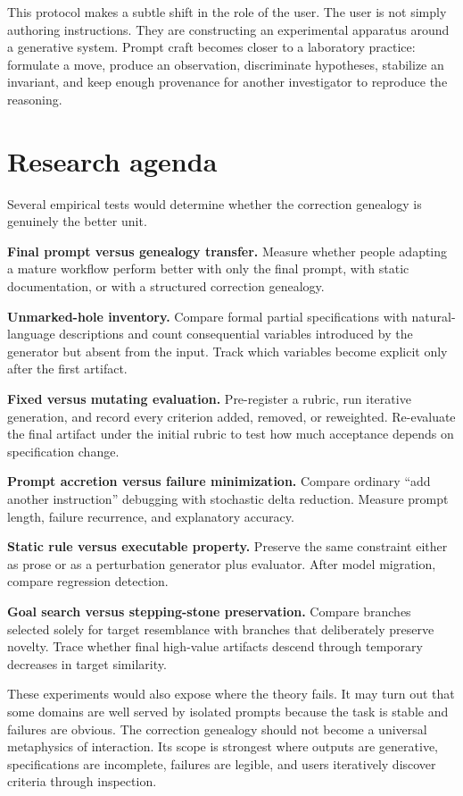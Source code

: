 \documentclass[11pt]{article}
\begin{document}
This protocol makes a subtle shift in the role of the user. The user is not simply authoring instructions. They are constructing an experimental apparatus around a generative system. Prompt craft becomes closer to a laboratory practice: formulate a move, produce an observation, discriminate hypotheses, stabilize an invariant, and keep enough provenance for another investigator to reproduce the reasoning.

\section{Research agenda}

Several empirical tests would determine whether the correction genealogy is genuinely the better unit.

\textbf{Final prompt versus genealogy transfer.} Measure whether people adapting a mature workflow perform better with only the final prompt, with static documentation, or with a structured correction genealogy.

\textbf{Unmarked-hole inventory.} Compare formal partial specifications with natural-language descriptions and count consequential variables introduced by the generator but absent from the input. Track which variables become explicit only after the first artifact.

\textbf{Fixed versus mutating evaluation.} Pre-register a rubric, run iterative generation, and record every criterion added, removed, or reweighted. Re-evaluate the final artifact under the initial rubric to test how much acceptance depends on specification change.

\textbf{Prompt accretion versus failure minimization.} Compare ordinary ``add another instruction'' debugging with stochastic delta reduction. Measure prompt length, failure recurrence, and explanatory accuracy.

\textbf{Static rule versus executable property.} Preserve the same constraint either as prose or as a perturbation generator plus evaluator. After model migration, compare regression detection.

\textbf{Goal search versus stepping-stone preservation.} Compare branches selected solely for target resemblance with branches that deliberately preserve novelty. Trace whether final high-value artifacts descend through temporary decreases in target similarity.

These experiments would also expose where the theory fails. It may turn out that some domains are well served by isolated prompts because the task is stable and failures are obvious. The correction genealogy should not become a universal metaphysics of interaction. Its scope is strongest where outputs are generative, specifications are incomplete, failures are legible, and users iteratively discover criteria through inspection.
\end{document}
